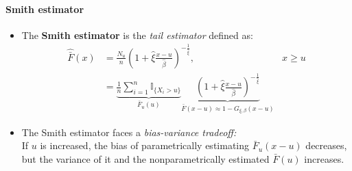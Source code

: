 \documentclass[a4paper,landscape,8pt,fleqn]{scrartcl}
\renewcommand{\emph}[1]{\textbf{#1}}
\begin{document}
\begin{multicols*}{3}
\paragraph{Smith estimator}
\begin{itemize}
\item The \emph{Smith estimator} is the \textit{tail estimator} defined as:
\begin{align*}
\hat{\bar F}(x) &= \frac{N_u}{n} \left( 1 + \hat \xi \frac{x-u}{\hat \beta} \right)^{-\frac{1}{\hat \xi}}, & x \geq u \\
&= \underbrace{\frac{1}{n} \sum_{i=1}^n \mathbb{I}_{\lbrace X_i > u \rbrace}}_{\bar F_u(u)} \underbrace{\left( 1 + \hat \xi \frac{x-u}{\hat \beta} \right)^{-\frac{1}{\hat \xi}}}_{\bar F(x-u) \approx 1-G_{\xi, \beta}(x-u)}
\end{align*}
\item The Smith estimator faces a \textit{bias-variance tradeoff:} \\
If $u$ is increased, the bias of parametrically estimating $\bar F_u(x-u)$ decreases, but the variance of it and the nonparametrically estimated $\bar F(u)$ increases.
\end{itemize}


\end{multicols*}
\end{document}
